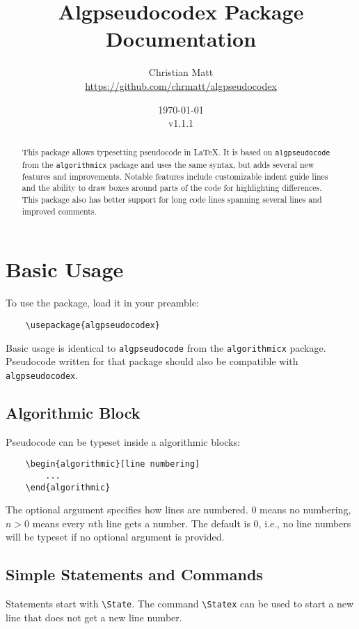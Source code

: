 \documentclass[11pt,a4paper,USenglish]{article}
\title{\bf{Algpseudocodex Package Documentation}}
\author{Christian Matt \\ \url{https://github.com/chrmatt/algpseudocodex}}
\date{\today\\v1.1.1}
\begin{document}
\maketitle

\begin{abstract}
	This package allows typesetting pseudocode in \LaTeX. It is based on \texttt{algpseudocode} from the \texttt{algorithmicx} package and uses the same syntax, but adds several new features and improvements. Notable features include customizable indent guide lines and the ability to draw boxes around parts of the code for highlighting differences. This package also has better support for long code lines spanning several lines and improved comments.
\end{abstract}

\newpage

\tableofcontents

\newpage

\section{Basic Usage}
To use the package, load it in your preamble:
\begin{verbatim}
	\usepackage{algpseudocodex}
\end{verbatim}

Basic usage is identical to \texttt{algpseudocode} from the \texttt{algorithmicx} package. Pseudocode written for that package should also be compatible with \texttt{algpseudocodex}.

\subsection{Algorithmic Block}
Pseudocode can be typeset inside a algorithmic blocks:
\begin{verbatim}
	\begin{algorithmic}[line numbering]
	    ...
	\end{algorithmic}
\end{verbatim}
The optional argument specifies how lines are numbered. $0$ means no numbering, $n > 0$ means every $n$th line gets a number. The default is $0$, i.e., no line numbers will be typeset if no optional argument is provided.

\subsection{Simple Statements and Commands}
Statements start with \verb|\State|. The command \verb|\Statex| can be used to start a new line that does not get a new line number.
\end{document}
